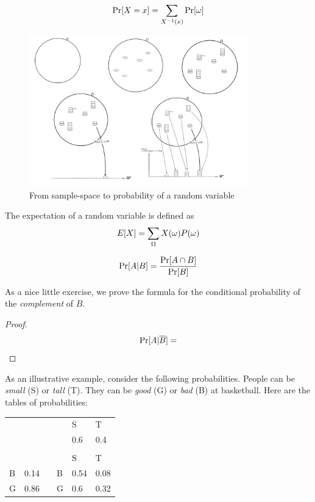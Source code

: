 $$ \operatorname{Pr}[X=x] = \sum_{X^{-1}(x)} \operatorname{Pr}[\omega] $$


\begin{figure}[H]
    \caption{From sample-space to probability of a random variable}
    \centering
      \includegraphics[width=0.85\textwidth]{images/prob.png}
\end{figure}


\begin{definition}[Expectation]
    The expectation of a random variable is defined as 
    $$ E[X] = \sum_{\Omega} X(\omega)P(\omega)$$ 
\end{definition}

\begin{definition}
    $$ \operatorname{Pr}[A | B] = \frac{\operatorname{Pr}[A \cap B]}{\operatorname{Pr}[B]}$$
\end{definition}

As a nice little exercise, we prove the formula for the conditional probability of the \emph{complement} of $B$.

\begin{proof}
    $$ \operatorname{Pr}[A | \overline{B}] = $$
\end{proof}



As an illustrative example, consider the following probabilities. People can be \emph{small} (S) or \emph{tall} (T). They can be \emph{good} (G) or \emph{bad} (B) at basketball.
Here are the tables of probabilities:

\begin{table}[H]
    \centering
    \begin{tabular}{llllll}
      &      &  &   & S    & T    \\
      &      &  &   & 0.6  & 0.4  \\
      &      &  &   &      &      \\
      &      &  &   & S    & T    \\
    B & 0.14 &  & B & 0.54 & 0.08 \\
    G & 0.86 &  & G & 0.6  & 0.32
    \end{tabular}
\end{table}

